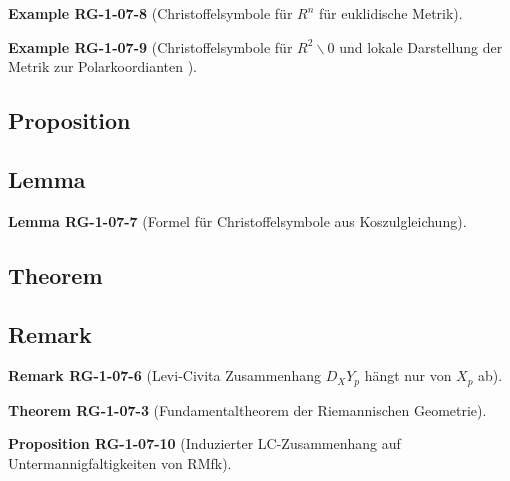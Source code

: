 \documentclass[10pt, letterpaper]{article}
\newcommand{\CustomHeading}[3]{%
  \par\medskip\noindent%
  \textbf{#1 #2} \textnormal{(#3)}.\enskip%
}
\newenvironment{PROP}[2]{\CustomHeading{Proposition}{#1}{#2}}{}
\newenvironment{THEO}[2]{\CustomHeading{Theorem}{#1}{#2}}{}
\newenvironment{LEM}[2]{\CustomHeading{Lemma}{#1}{#2}}{}
\newenvironment{REM}[2]{\CustomHeading{Remark}{#1}{#2}}{}
\newenvironment{EXA}[2]{\CustomHeading{Example}{#1}{#2}}{}
\begin{document}
\begin{EXA}{RG-1-07-8}{Christoffelsymbole für $R^n$ für euklidische Metrik}

\end{EXA}

\begin{EXA}{RG-1-07-9}{Christoffelsymbole für $R^2\backslash 0$ und lokale Darstellung der Metrik zur Polarkoordianten }

\end{EXA}



\subsection{Proposition}



\subsection{Lemma}



\begin{LEM}{RG-1-07-7}{Formel für Christoffelsymbole aus Koszulgleichung}

\end{LEM}

\subsection{Theorem}

\subsection{Remark}



\begin{REM}{RG-1-07-6}{Levi-Civita Zusammenhang $D_XY_p$ hängt nur von $X_p$ ab}

\end{REM}





\begin{THEO}{RG-1-07-3}{Fundamentaltheorem der Riemannischen Geometrie}

\end{THEO}





\begin{PROP}{RG-1-07-10}{Induzierter LC-Zusammenhang auf Untermannigfaltigkeiten von RMfk}

\end{PROP}
\end{document}
